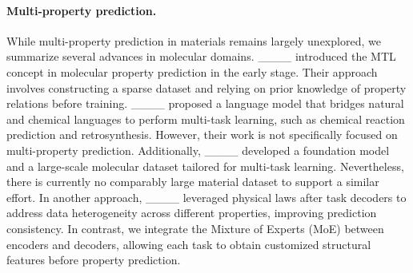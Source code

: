 \paragraph{Multi-property prediction.} While multi-property prediction in materials remains largely unexplored, we summarize several advances in molecular domains. ____ introduced the MTL concept in molecular property prediction in the early stage. Their approach involves constructing a sparse dataset and relying on prior knowledge of property relations before training. ____ proposed a language model that bridges natural and chemical languages to perform multi-task learning, such as chemical reaction prediction and retrosynthesis. However, their work is not specifically focused on multi-property prediction. Additionally, ____ developed a foundation model and a large-scale molecular dataset tailored for multi-task learning. Nevertheless, there is currently no comparably large material dataset to support a similar effort. In another approach, ____ leveraged physical laws after task decoders to address data heterogeneity across different properties, improving prediction consistency. 
In contrast, we integrate the Mixture of Experts (MoE) between encoders and decoders, allowing each task to obtain customized structural features before property prediction.